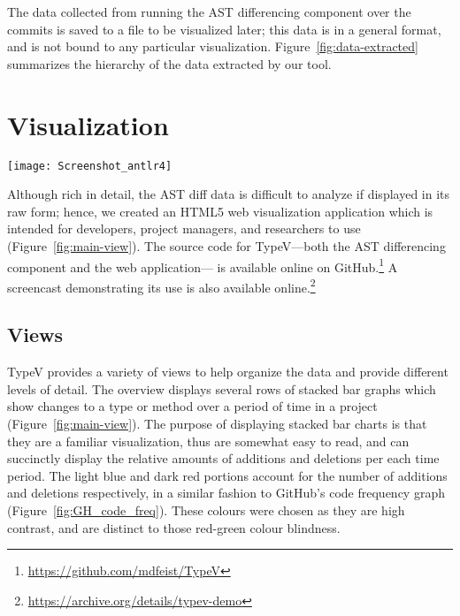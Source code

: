 The data collected from running the AST differencing component over the commits is saved to a file to be visualized later; this data is in a general format, and is not bound to any particular visualization. Figure~\ref{fig:data-extracted} summarizes the hierarchy of the data extracted by our tool.

\section{Visualization}

\label{sec:viz}

\begin{figure*}[!ht]
\centering
\texttt{[image: Screenshot\_antlr4]}
\caption{Screenshot showing the main view for TypeV. The data being displayed is from the ANTLR4 repository. Light blue bars \additionsbox{10pt} indicate \textbf{additions}; dark red bars \deletionsbox{10pt} indicate \textbf{deletions}.}
\label{fig:main-view}
\end{figure*}

Although rich in detail, the AST diff data is difficult to analyze if displayed in its raw form; hence, we created an HTML5 web visualization application which is intended for developers, project managers, and researchers to use (Figure~\ref{fig:main-view}). The source code for TypeV---both the AST differencing component and the web application--- is available online on GitHub.\footnote{\url{https://github.com/mdfeist/TypeV}} A screencast demonstrating its use is also available online.\footnote{\url{https://archive.org/details/typev-demo}}

\subsection{Views}

TypeV provides a variety of views to help organize the data and provide different levels of detail. The overview displays several rows of stacked bar graphs which show changes to a type or method over a period of time in a project (Figure~\ref{fig:main-view}). The purpose of displaying stacked bar charts is that they are a familiar visualization, thus are somewhat easy to read, and can succinctly display the relative amounts of additions and deletions per each time period. The light blue \additionsbox{10pt} and dark red \deletionsbox{10pt} portions account for the number of additions and deletions respectively, in a similar fashion to GitHub's code frequency graph (Figure~\ref{fig:GH_code_freq}). These colours were chosen as they are high contrast, and are distinct to those red-green colour blindness.

